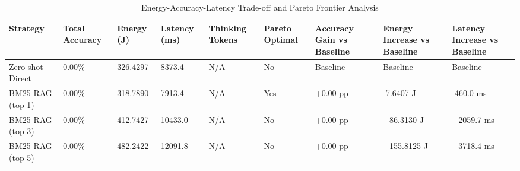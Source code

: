 \begin{table}
\caption{Energy-Accuracy-Latency Trade-off and Pareto Frontier Analysis}
\label{tab:tradeoff_comparison}
\begin{tabular}{lllllllll}
\toprule
Strategy & Total Accuracy & Energy (J) & Latency (ms) & Thinking Tokens & Pareto Optimal & Accuracy Gain vs Baseline & Energy Increase vs Baseline & Latency Increase vs Baseline \\
\midrule
Zero-shot Direct & 0.00\% & 326.4297 & 8373.4 & N/A & No & Baseline & Baseline & Baseline \\
BM25 RAG (top-1) & 0.00\% & 318.7890 & 7913.4 & N/A & Yes & +0.00 pp & -7.6407 J & -460.0 ms \\
BM25 RAG (top-3) & 0.00\% & 412.7427 & 10433.0 & N/A & No & +0.00 pp & +86.3130 J & +2059.7 ms \\
BM25 RAG (top-5) & 0.00\% & 482.2422 & 12091.8 & N/A & No & +0.00 pp & +155.8125 J & +3718.4 ms \\
\bottomrule
\end{tabular}
\end{table}
